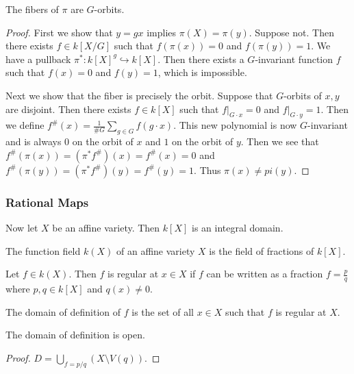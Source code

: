 \documentclass[twoside, 10pt]{article}
\begin{document}
    \begin{prop}
        The fibers of $\pi$ are $G$-orbits.
        \begin{proof}
            First we show that $y = gx$ implies $\pi(X) = \pi(y)$. Suppose not. Then there exists $f \in k[X/G]$ such that $f(\pi(x)) = 0$ and $f(\pi(y)) = 1$. We have a pullback $\pi^*: k[X]^g \hookrightarrow k[X]$. Then there exists a $G$-invariant function $f$ such that $f(x) = 0$ and $f(y) = 1$, which is impossible.

            Next we show that the fiber is precisely the orbit. Suppose that $G$-orbits of $x,y$ are disjoint. Then there exists $f \in k[X]$ such that $f \vert_{G \cdot x} = 0$ and $f \vert_{G \cdot y} = 1$. Then we define $f^\#(x) = \frac{1}{\#G} \sum_{g \in G} f(g \cdot x)$. This new polynomial is now $G$-invariant and is always $0$ on the orbit of $x$ and $1$ on the orbit of $y$. Then we see that $f^{\#}(\pi(x)) = (\pi^*f^{\#})(x) = f^{\#}(x) = 0$ and $f^{\#}(\pi(y)) = (\pi^*f^{\#})(y) = f^{\#}(y) = 1$. Thus $\pi(x) \neq pi(y)$.
        \end{proof}
    \end{prop}

    \subsubsection{Rational Maps}

    Now let $X$ be an affine variety. Then $k[X]$ is an integral domain.
    \begin{defn}
        The function field $k(X)$ of an affine variety $X$ is the field of fractions of $k[X]$.
    \end{defn}

    \begin{defn}
        Let $f \in k(X)$. Then $f$ is regular at $x \in X$ if $f$ can be written as a fraction $f = \frac{p}{q}$ where $p,q \in k[X]$ and $q(x) \neq 0$.
    \end{defn}

    \begin{defn}
        The domain of definition of $f$ is the set of all $x \in X$ such that $f$ is regular at $X$.
    \end{defn}

    \begin{prop}
        The domain of definition is open.
        \begin{proof}
            $D = \bigcup_{f = p/q} (X\setminus V(q))$.
        \end{proof}
    \end{prop}
\end{document}
